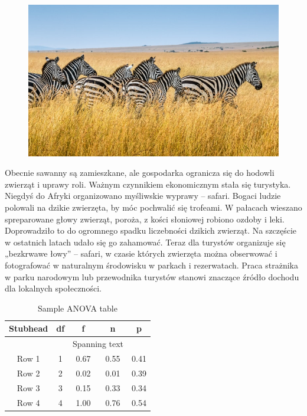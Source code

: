\documentclass[14pt]{beamer}
\begin{document}
\begin{frame}{\color{black}{Zdjecie zebr na sawannie}}
    
    \begin{figure}
        \centering
        \includegraphics[scale = 0.4082]{Sawanna2.jpg}
        \label{fig:my_label}
    \end{figure}
    
\end{frame}

\begin{frame}{\color{black}{Ludzie na sawannie}}
    
    \tiny  Obecnie sawanny są zamieszkane, ale gospodarka ogranicza się do hodowli zwierząt i uprawy roli. Ważnym czynnikiem ekonomicznym stała się turystyka. Niegdyś do Afryki organizowano myśliwskie wyprawy – safari. Bogaci ludzie polowali na dzikie zwierzęta, by móc pochwalić się trofeami. W pałacach wieszano spreparowane głowy zwierząt, poroża, z kości słoniowej robiono ozdoby i leki. Doprowadziło to do ogromnego spadku liczebności dzikich zwierząt. Na szczęście w ostatnich latach udało się go zahamować. Teraz dla turystów organizuje się „bezkrwawe łowy” – safari, w czasie których zwierzęta można obserwować i fotografować w naturalnym środowisku w parkach i rezerwatach. Praca strażnika w parku narodowym lub przewodnika turystów stanowi znaczące źródło dochodu dla lokalnych społeczności.
    
\end{frame}

\begin{frame}{\color{black}{Tabela}}

\begin{table}[]
 \centering
 \caption{Sample ANOVA table}
 \begin{tabular}{c c c c c} 
 \hline
 Stubhead & df & f & n & p \\ [0.5ex] 
 \hline
  & & \multicolumn{2}{c}{Spanning text} \\
 Row 1 & 1 & 0.67 & 0.55 & 0.41 \\
 Row 2 & 2 & 0.02 & 0.01 & 0.39 \\
 Row 3 & 3 & 0.15 & 0.33 & 0.34 \\
 Row 4 & 4 & 1.00 & 0.76 & 0.54 \\
 \hline
 \end{tabular}
\end{table}

\end{frame}
\end{document}
